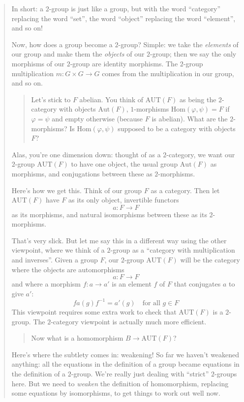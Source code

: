 \documentclass{article}
\begin{document}
\begin{quote}
In short: a \(2\)-group is just like a group, but with the word
``category'' replacing the word ``set'', the word ``object'' replacing
the word ``element'', and so on!

Now, how does a group become a \(2\)-group? Simple: we take the
\emph{elements} of our group and make them the \emph{objects} of our
\(2\)-group; then we say the only morphisms of our \(2\)-group are
identity morphisms. The \(2\)-group multiplication
\(m\colon G \times G \to G\) comes from the multiplication in our group,
and so on.

\begin{quote}
Let's stick to \(F\) abelian. You think of \(\mathrm{AUT}(F)\) as being
the \(2\)-category with objects \(\mathrm{Aut}(F)\), \(1\)-morphisms
\(\mathrm{Hom}(\varphi,\psi)=F\) if \(\varphi=\psi\) and empty otherwise
(because \(F\) is abelian). What are the \(2\)-morphisms? Is
\(\mathrm{Hom}(\varphi,\psi)\) supposed to be a category with objects
\(F\)?
\end{quote}

Alas, you're one dimension down: thought of as a \(2\)-category, we want
our \(2\)-group \(\mathrm{AUT}(F)\) to have one object, the usual group
\(\mathrm{Aut}(F)\) as morphisms, and conjugations between these as
\(2\)-morphisms.

Here's how we get this. Think of our group \(F\) as a category. Then let
\(\mathrm{AUT}(F)\) have \(F\) as its only object, invertible functors
\[a\colon F \to F\] as its morphisms, and natural isomorphisms between
these as its \(2\)-morphisms.

That's very slick. But let me say this in a different way using the
other viewpoint, where we think of a \(2\)-group as a ``category with
multiplication and inverses''. Given a group \(F\), our \(2\)-group
\(\mathrm{AUT}(F)\) will be the category where the objects are
automorphisms \[a\colon F \to F\] and where a morphism
\(f\colon a \to a'\) is an element \(f\) of \(F\) that conjugates \(a\)
to give \(a'\): \[f a(g) f^{-1} = a'(g) \quad\mbox{for all $g \in F$}\]
This viewpoint requires some extra work to check that
\(\mathrm{AUT}(F)\) is a \(2\)-group. The \(2\)-category viewpoint is
actually much more efficient.

\begin{quote}
Now what is a homomorphism \(B \to \mathrm{AUT}(F)\)?
\end{quote}

Here's where the subtlety comes in: weakening! So far we haven't
weakened anything: all the equations in the definition of a group became
equations in the definition of a \(2\)-group. We're really just dealing
with ``strict'' \(2\)-groups here. But we need to \emph{weaken} the
definition of homomorphism, replacing some equations by isomorphisms, to
get things to work out well now.


\end{quote}
\end{document}
